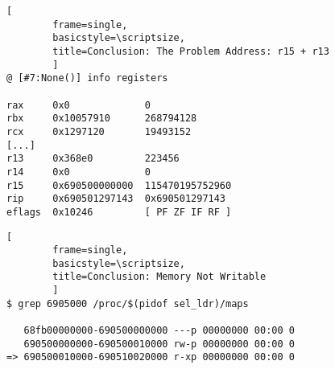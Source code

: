 \documentclass[compress,red]{beamer}
\begin{document}
\pagebreak
\begin{lstlisting}[
        frame=single,
        basicstyle=\scriptsize,
        title=Conclusion: The Problem Address: r15 + r13
        ]
@ [#7:None()] info registers

rax     0x0             0
rbx     0x10057910      268794128
rcx     0x1297120       19493152
[...]
r13     0x368e0         223456
r14     0x0             0
r15     0x690500000000  115470195752960
rip     0x690501297143  0x690501297143
eflags  0x10246         [ PF ZF IF RF ]
\end{lstlisting}
\newpage

\pagebreak
\begin{lstlisting}[
        frame=single,
        basicstyle=\scriptsize,
        title=Conclusion: Memory Not Writable
        ]
$ grep 6905000 /proc/$(pidof sel_ldr)/maps

   68fb00000000-690500000000 ---p 00000000 00:00 0
   690500000000-690500010000 rw-p 00000000 00:00 0
=> 690500010000-690510020000 r-xp 00000000 00:00 0
\end{lstlisting}
\newpage

%

%
\section*{}

\end{document}
